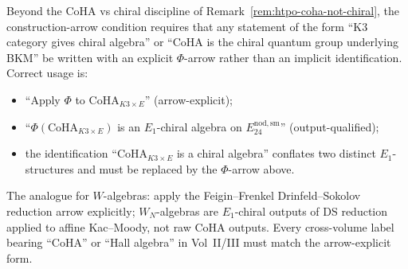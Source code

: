 \begin{remark}
\label{rem:htpo-construction-arrow}

Beyond the CoHA vs chiral discipline of
Remark~\ref{rem:htpo-coha-not-chiral}, the construction-arrow condition
requires
that any statement of the form ``K3 category gives chiral algebra'' or
``CoHA is the chiral quantum group underlying BKM'' be written with an
explicit $\Phi$-arrow rather than an implicit identification. Correct
usage is:
\begin{itemize}
\item ``Apply $\Phi$ to $\mathrm{CoHA}_{K3\times E}$'' (arrow-explicit);
\item ``$\Phi(\mathrm{CoHA}_{K3\times E})$ is an $E_1$-chiral algebra
on $E^{\mathrm{nod,sm}}_{24}$'' (output-qualified);
\item the identification ``$\mathrm{CoHA}_{K3\times E}$ is a chiral
algebra'' conflates two distinct $E_1$-structures and must be replaced
by the $\Phi$-arrow above.
\end{itemize}
The analogue for $W$-algebras: apply the
Feigin--Frenkel Drinfeld--Sokolov reduction arrow explicitly;
$W_N$-algebras are $E_1$-chiral outputs of DS reduction applied to
affine Kac--Moody, not raw CoHA outputs. Every cross-volume label
bearing ``CoHA'' or ``Hall algebra'' in Vol~II/III must match the
arrow-explicit form.
\end{remark}

